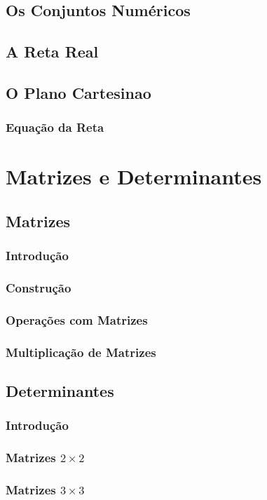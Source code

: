 \documentclass[12pt,a4paper]{book}
\begin{document}
	\section{Os Conjuntos Numéricos}
	\section{A Reta Real}
	\section{O Plano Cartesinao}
		\subsection{Equação da Reta}
		
\chapter{Matrizes e Determinantes}

	
	\section{Matrizes}
		\subsection{Introdução}
		\subsection{Construção}
		\subsection{Operações com Matrizes}
		\subsection{Multiplicação de Matrizes}
	
	\section{Determinantes}
		\subsection{Introdução}
		\subsection{Matrizes $2\times 2$}
		\subsection{Matrizes $3\times 3$}
		
\end{document}
